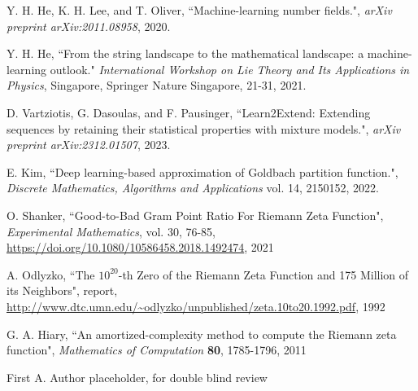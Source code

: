 \documentclass[journal]{IEEEtai}
\begin{document}
\begin{thebibliography}{34}
Y. H. He, K. H. Lee, and T. Oliver, 
``Machine-learning number fields.",
\emph{arXiv preprint arXiv:2011.08958}, 2020.

Y. H. He,
``From the string landscape to the mathematical landscape: a machine-learning outlook."
\emph{International Workshop on Lie Theory and Its Applications in Physics}, Singapore, Springer Nature Singapore, 21-31, 2021.

D. Vartziotis, G. Dasoulas,  and  F. Pausinger,
``Learn2Extend: Extending sequences by retaining their statistical properties with mixture models.",
\emph{arXiv preprint arXiv:2312.01507}, 2023.

E. Kim, 
``Deep learning-based approximation of Goldbach partition function.",
\emph{Discrete Mathematics, Algorithms and Applications} vol. 14,  2150152, 2022.

 O. Shanker, 
``Good-to-Bad Gram Point Ratio For Riemann Zeta Function",
\emph{Experimental Mathematics}, vol. 30, 76-85, 
\url{https://doi.org/10.1080/10586458.2018.1492474}, 2021

  A. Odlyzko,
``The $10^{20}$-th Zero of the Riemann Zeta
Function and 175 Million of its Neighbors", report,
\url{http://www.dtc.umn.edu/~odlyzko/unpublished/zeta.10to20.1992.pdf}, 1992

 G. A. Hiary,
``An amortized-complexity method to compute the Riemann zeta function", 
{\it Mathematics of Computation} {\bf80}, 1785-1796, 2011


\end{thebibliography}






\begin{IEEEbiography}{First A. Author}{\space}   placeholder, for double blind review
\end{IEEEbiography}
\end{document}
